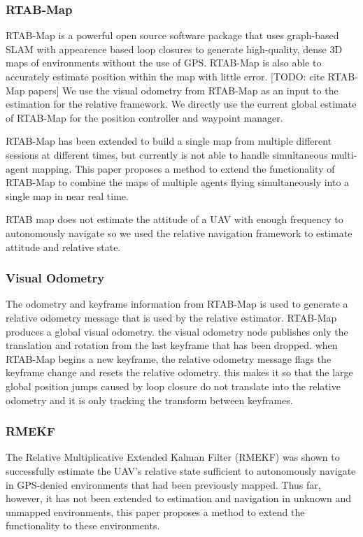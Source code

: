 \documentclass[letterpaper, 10 pt, conference]{ieeeconf}  %
\newcommand{\todo}[1]{{\color{blue}[TODO: #1]}}
\begin{document}
\subsubsection{RTAB-Map}

RTAB-Map is a powerful open source software package that uses graph-based SLAM with appearence based loop closures to generate high-quality, dense 3D maps of environments without the use of GPS. RTAB-Map is also able to accurately estimate position within the map with little error. \todo{cite RTAB-Map papers} We use the visual odometry from RTAB-Map as an input to the estimation for the relative framework. We directly use the current global estimate of RTAB-Map for the position controller and waypoint manager.

RTAB-Map has been extended to build a single map from multiple different sessions at different times, but currently is not able to handle simultaneous multi-agent mapping. This paper proposes a method to extend the functionality of RTAB-Map to combine the maps of multiple agents flying simultaneously into a single map in near real time.

RTAB map does not estimate the attitude of a UAV with enough frequency to autonomously navigate so we used the relative navigation framework to estimate attitude and relative state.

\subsubsection{Visual Odometry}

The odometry and keyframe information from RTAB-Map is used to generate a relative odometry message that is used by the relative estimator. RTAB-Map produces a global visual odometry. the visual odometry node publishes only the translation and rotation from the last keyframe that has been dropped. when RTAB-Map begins a new keyframe, the relative odometry message flags the keyframe change and resets the relative odometry. this makes it so that the large global position jumps caused by loop closure do not translate into the relative odometry and it is only tracking the transform between keyframes.

\subsubsection{RMEKF}
The Relative Multiplicative Extended Kalman Filter (RMEKF) was shown to successfully estimate the UAV's relative state sufficient to autonomously navigate in GPS-denied environments that had been previously mapped. Thus far, however, it has not been extended to estimation and navigation in unknown and unmapped environments, this paper proposes a method to extend the functionality to these environments.
\end{document}
